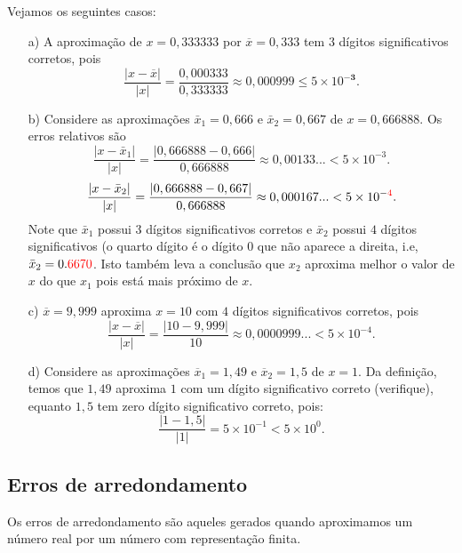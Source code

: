 \documentclass[main.tex]{subfiles}
\begin{document}
\begin{ex} Vejamos os seguintes casos:
\begin{itemize}
\item[a)] A aproximação de $x=0,333333$ por $\overline{x}=0,333$ tem $3$ dígitos significativos corretos, pois
  \begin{equation*}
    \frac{|x-\overline{x}|}{|x|} = \frac{0,000333}{0,333333} \approx 0,000999 \leq 5\times 10^{-\pmb{3}}.
  \end{equation*}
\item[b)] Considere as aproximações $\bar{x}_1=0,666$ e $\bar{x}_2=0,667$ de $x=0,666888$. Os erros relativos são
  $$
    \frac{|x-\bar{x}_1|}{|x|} = \frac{|0,666888-0,666|}{0,666888} \approx 0,00133...< 5\times 10^{-3}.
  $$
  $$
    \frac{|x-\bar{x}_2|}{|x|} = \frac{|0,666888-0,667|}{0,666888} \approx 0,000167...< 5\times 10^{-{\color{red}{4}}}.
  $$
  Note que $\bar{x}_1$ possui $3$ dígitos significativos corretos e $\bar{x}_2$ possui $4$ dígitos significativos (o quarto dígito é o dígito $0$ que não aparece a direita, i.e, $\bar{x}_2=0.{\color{red}{6670}}$. Isto também leva a conclusão que $x_2$ aproxima melhor o valor de $x$ do que $x_1$ pois está mais próximo de $x$.
  
\item[c)] $\overline{x} = 9,999$ aproxima $x = 10$ com $4$ dígitos significativos corretos, pois  
  \begin{equation*}
    \frac{|x-\overline{x}|}{|x|} = \frac{|10 - 9,999|}{10} \approx 0,0000999...< 5\times 10^{-4}.
  \end{equation*}
\item[d)] Considere as aproximações $\overline{x}_1 = 1,49$ e $\overline{x}_2 = 1,5$ de $x = 1$. Da definição, temos que $1,49$ aproxima $1$ com um dígito significativo correto (verifique), equanto $1,5$ tem zero dígito significativo correto, pois:
  \begin{equation*}
    \frac{|1-1,5|}{|1|} = 5\times 10^{-1} < 5\times 10^{0}.
  \end{equation*}
\end{itemize}
\end{ex}

\subsection{Erros de arredondamento}{\label{arredondamento_sec}}
Os erros de arredondamento são aqueles gerados quando aproximamos um número real por um número com representação finita.
\end{document}
